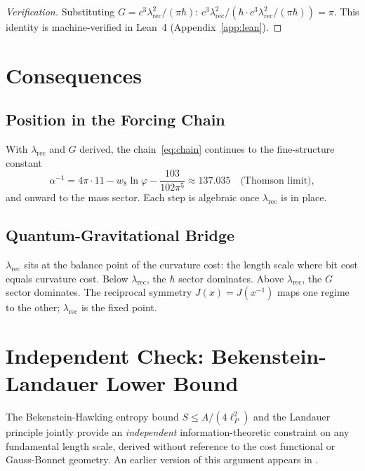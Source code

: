 \documentclass[12pt]{article}
\theoremstyle{definition}
\theoremstyle{remark}
\begin{document}
\begin{proof}[Verification]
Substituting $G = c^3 \lambda_{\mathrm{rec}}^2/(\pi\hbar)$:
$c^3\lambda_{\mathrm{rec}}^2/(\hbar \cdot c^3
\lambda_{\mathrm{rec}}^2/(\pi\hbar)) = \pi$.
This identity is machine-verified in Lean~4
(Appendix~\ref{app:lean}).
\end{proof}

\section{Consequences}
\label{sec:consequences}

\subsection{Position in the Forcing Chain}

With $\lambda_{\mathrm{rec}}$ and $G$ derived, the
chain~\eqref{eq:chain} continues to the fine-structure constant
\begin{equation}
  \alpha^{-1} = 4\pi \cdot 11 - w_8 \ln\varphi
    - \frac{103}{102\pi^5}
    \approx 137.035
    \quad\text{(Thomson limit)},
\end{equation}
and onward to the mass sector. Each step is algebraic once
$\lambda_{\mathrm{rec}}$ is in place.

\subsection{Quantum-Gravitational Bridge}

$\lambda_{\mathrm{rec}}$ sits at the balance point of the
curvature cost: the length scale where bit cost equals curvature cost.
Below $\lambda_{\mathrm{rec}}$, the $\hbar$ sector dominates. Above
$\lambda_{\mathrm{rec}}$, the $G$ sector dominates. The reciprocal
symmetry $J(x) = J(x^{-1})$ maps one regime to the other;
$\lambda_{\mathrm{rec}}$ is the fixed point.

\section{Independent Check: Bekenstein-Landauer Lower Bound}
\label{sec:bekenstein}

The Bekenstein-Hawking entropy bound $S \leq A/(4\ell_P^2)$ and the
Landauer principle jointly provide an \emph{independent}
information-theoretic constraint on any fundamental length scale,
derived without reference to the cost functional or Gauss-Bonnet
geometry. An earlier version of this argument appears in
\cite{Washburn2025IntrinsicLattice}.
\end{document}
